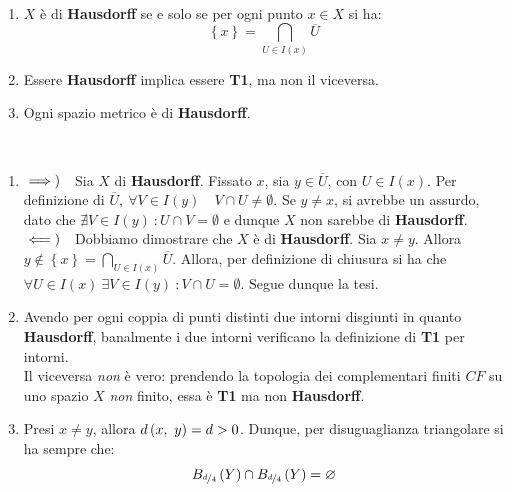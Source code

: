 \begin{observes}~{}
	\begin{enumerate}
		\item $X$ è di \textbf{Hausdorff} se e solo se per ogni punto $x\in X$ si ha:
		\begin{equation}
			\left\{x\right\}=\bigcap_{U\in I\left(x\right)}\overline{U}
		\end{equation}
	\item Essere \textbf{Hausdorff} implica essere \textbf{T1}, ma non il viceversa.
		\item Ogni spazio metrico è di \textbf{Hausdorff}.
	\end{enumerate}
\vspace{-3mm}
\end{observes}
\begin{demonstration}~{}
\begin{enumerate}[label=\Roman*]
\item $\impliesdx$Sia $X$ di \textbf{Hausdorff}. Fissato $x$, sia $y\in\overline{U}$, con $U\in I\left(x\right)$. Per definizione di $\overline{U},\ \forall V\in I\left(y\right)\quad V\cap U\neq\emptyset$. Se $y \neq x$, si avrebbe un assurdo, dato che $\nexists V\in I\left(y\right)\ \colon U\cap V=\emptyset$ e dunque $X$ non sarebbe di \textbf{Hausdorff}.\\
$\impliessx$Dobbiamo dimostrare che $X$ è di \textbf{Hausdorff}. Sia $x\neq y$. Allora $\displaystyle y\notin\left\{x\right\}=\bigcap_{U\in I\left(x\right)}\overline{U}$. Allora, per definizione di chiusura si ha che $\forall U\in I\left(x\right)\ \exists V\in I\left(y\right)\ \colon V\cap U=\emptyset$. Segue dunque la tesi.
\item Avendo per ogni coppia di punti distinti due intorni disgiunti in quanto \textbf{Hausdorff}, banalmente i due intorni verificano la definizione di \textbf{T1} per intorni.\\
Il viceversa \textit{non} è vero: prendendo la topologia dei complementari finiti $CF$ su uno spazio $X$ \textit{non} finito, essa è \textbf{T1} ma non \textbf{Hausdorff}.
\item Presi $x\neq y$, allora $\mvf{d}{x}{y}=d>0$. Dunque, per disuguaglianza triangolare si ha sempre che:
\begin{equation*}
B_{\nicefrac{d}{4}}\left(Y\right)\cap B_{\nicefrac{d}{4}}\left(Y\right)=\emptyset
\end{equation*}
\end{enumerate}
\vspace{-6mm}
\end{demonstration}
